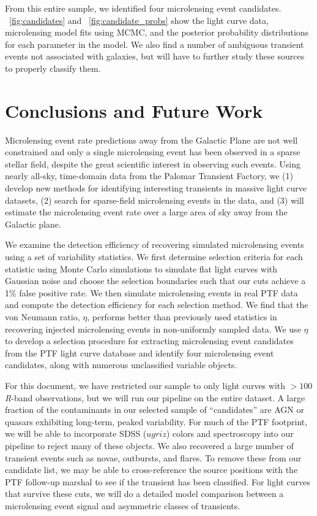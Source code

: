 \documentclass[iop]{emulateapj}
\begin{document}
From this entire sample, we identified four microlensing event candidates. \figurename~\ref{fig:candidates} and \figurename~\ref{fig:candidate_probs} show the light curve data, microlensing model fits using MCMC, and the posterior probability distributions for each parameter in the model. We also find a number of ambiguous transient events not associated with galaxies, but will have to further study these sources to properly classify them.

\section{Conclusions and Future Work}
Microlensing event rate predictions away from the Galactic Plane are not well constrained and only a single microlensing event has been observed in a sparse stellar field, despite the great scientific interest in observing such events. Using nearly all-sky, time-domain data from the Palomar Transient Factory, we (1) develop new methods for identifying interesting transients in massive light curve datasets, (2) search for sparse-field microlensing events in the data, and (3) will estimate the microlensing event rate over a large area of sky away from the Galactic plane. 

We examine the detection efficiency of recovering simulated microlensing events using a set of variability statistics. We first determine selection criteria for each statistic using Monte Carlo simulations to simulate flat light curves with Gaussian noise and choose the selection boundaries such that our cuts achieve a 1\% false positive rate. We then simulate microlensing events in real PTF data and compute the detection efficiency for each selection method. We find that the von Neumann ratio, $\eta$, performs better than previously used statistics in recovering injected microlensing events in non-uniformly sampled data. We use $\eta$ to develop a selection procedure for extracting microlensing event candidates from the PTF light curve database and identify four microlensing event candidates, along with numerous unclassified variable objects.

For this document, we have restricted our sample to only light curves with $>100$ \textit{R}-band observations, but we will run our pipeline on the entire dataset. A large fraction of the contaminants in our selected sample of ``candidates'' are AGN or quasars exhibiting long-term, peaked variability. For much of the PTF footprint, we will be able to incorporate SDSS ($ugriz$) colors and spectroscopy into our pipeline to reject many of these objects. We also recovered a large number of transient events such as novae, outbursts, and flares. To remove these from our candidate list, we may be able to cross-reference the source positions with the PTF follow-up marshal to see if the transient has been classified. For light curves that survive these cuts, we will do a detailed model comparison between a microlensing event signal and asymmetric classes of transients. 
\end{document}
